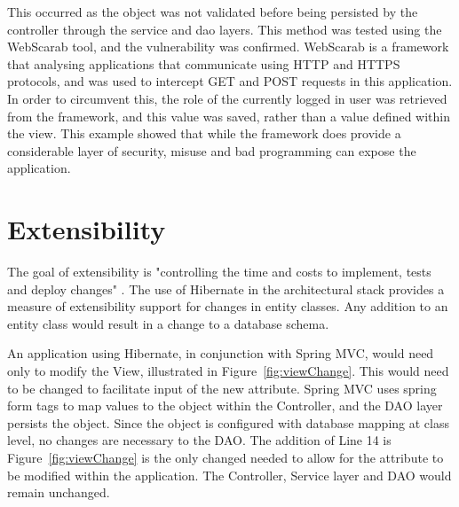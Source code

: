 This occurred as the object was not validated before being persisted by the controller through the service and dao layers. This method was tested using the WebScarab tool, and the vulnerability was confirmed. WebScarab is a framework that analysing applications that communicate using HTTP and HTTPS protocols, and was used to intercept GET and POST requests in this application. In order to circumvent this, the role of the currently logged in user was retrieved from the framework, and this value was saved, rather than a value defined within the view. This example showed that while the framework does provide a considerable layer of security, misuse and bad programming can expose the application. 

\section{Extensibility}

The goal of extensibility is "controlling the time and costs to implement, tests and deploy changes" \parencite{bass2003software}. The use of Hibernate in the architectural stack provides a measure of extensibility support for changes in entity classes. Any addition to an entity class would result in a change to a database schema. 

An application using Hibernate, in conjunction with Spring MVC, would need only to modify the View, illustrated in Figure~\ref{fig:viewChange}. This would need to be changed to facilitate input of the new attribute. Spring MVC uses spring form tags to map values to the object within the Controller, and the DAO layer persists the object. Since the object is configured with database mapping at class level, no changes are necessary to the DAO. The addition of Line 14 is Figure~\ref{fig:viewChange} is the only changed needed to allow for the attribute to be modified within the application. The Controller, Service layer and DAO would remain unchanged.

